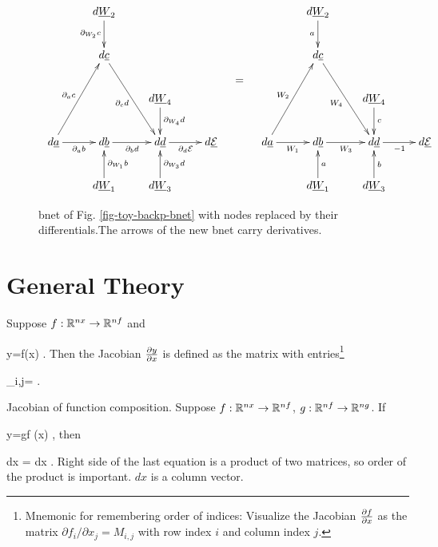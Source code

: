 \begin{figure}[h!]
\centering
$$
\begin{array}{ccc}
\xymatrix{
&d\rvW_2\ar[d]_{\partial_{W_2}c}
\\
&d\rvc\ar[rdd]_{\partial_{c}d}
\\
&&d\rvW_4\ar[d]^{\partial_{W_4}d}
\\
d\rva\ar[r]_{\partial_{a}b}
\ar[ruu]^{\partial_{a}c}
&d\rvb\ar[r]_{\partial_{b}d}
&d\rvd\ar[r]_{\partial_d \cale}
&d\ul{\cale}
\\
&d\rvW_1\ar[u]_{\partial_{W_1}b}
&d\rvW_3\ar[u]_{\partial_{W_3}d}
}
&
\xymatrix{\\ \\ =}
&
\xymatrix{
&d\rvW_2\ar[d]_{a}
\\
&d\rvc\ar[rdd]_{W_4}
\\
&&d\rvW_4\ar[d]^{c}
\\
d\rva\ar[r]_{W_1}
\ar[ruu]^{W_2}
&d\rvb\ar[r]_{W_3}
&d\rvd\ar[r]_{-1}
&d\ul{\cale}
\\
&d\rvW_1\ar[u]_{a}
&d\rvW_3\ar[u]_{b}
}
\end{array}
$$
\caption{bnet of
Fig. \ref{fig-toy-backp-bnet}
with nodes
replaced by their differentials.The arrows of the new bnet
 carry derivatives.
}
\label{fig-toy-backp-deriv-bnet}
\end{figure}










\section{General Theory}


Suppose
 $f:{ \mathbb{R}}^{nx}\rightarrow { \mathbb{R}}^{nf}$
and

\beq
y=f(x)
\;.
\eeq
Then the Jacobian $\frac{\partial y}{\partial x}$
is defined as the matrix with entries\footnote{
Mnemonic for remembering
order of indices: 
Visualize the Jacobian $\frac{\partial f}{\partial x}$ as
the matrix $\partial f_i/\partial x_j=M_{i,j}$
with row index $i$ and column index $j$.}

\beq
{}_{i,j}=
\;.
\eeq




Jacobian of function composition.
Suppose $f:{ \mathbb{R}}^{nx}\rightarrow{ \mathbb{R}}^{nf}$,
$g:{ \mathbb{R}}^{nf}\rightarrow { \mathbb{R}}^{ng}$. If

\beq
y=g\circ f (x)
\;,
\eeq
then

\beq
{}dx
=
dx
\;.
\eeq
Right side
of the last equation
is a product
of two matrices,
so order of the product is important. $dx$ is
a column vector.





